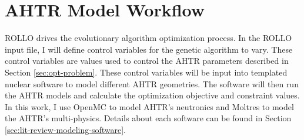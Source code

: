 \section{AHTR Model Workflow}
\gls{ROLLO} drives the evolutionary algorithm optimization process. 
In the \gls{ROLLO} input file, I will define control variables for the genetic algorithm 
to vary. 
These control variables are values used to control the \gls{AHTR} parameters described in 
Section \ref{sec:opt-problem}.
These control variables will be input into templated nuclear software to model different 
AHTR geometries.
The software will then run the \gls{AHTR} models and calculate the optimization objective 
and constraint values. 
In this work, I use OpenMC \cite{romano_openmc:_2015} to model \gls{AHTR}'s neutronics 
and Moltres \cite{lindsay_introduction_2018} to model the \gls{AHTR}'s multi-physics. 
Details about each software can be found in Section \ref{sec:lit-review-modeling-software}.

